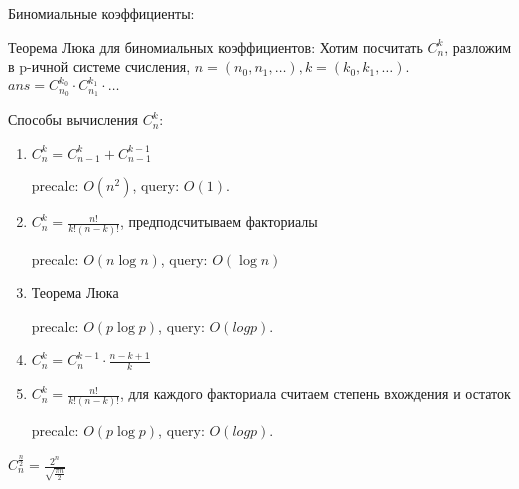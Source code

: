 Биномиальные коэффициенты:

Теорема Люка для биномиальных коэффициентов:
Хотим посчитать $C_n^k$, разложим в p-ичной системе счисления, 
$n = (n_0, n_1, \dots), k = (k_0, k_1, \dots)$.
$ans = C_{n_0} ^ {k_0} \cdot C_{n_1}^{k_1} \cdot \dots$

Способы вычисления $C_n^k$:
\begin{enumerate}
  \item
  $C_n^k = C_{n-1}^k + C_{n-1}^{k-1}$
  
  precalc: $O(n^2)$, query: $O(1)$.
  
  \item
  $C_n^k = \frac{n!}{k!(n - k)!}$, предподсчитываем факториалы
    
  precalc: $O(n \log n)$, query: $O(\log n)$
  
  \item
  Теорема Люка
    
  precalc: $O(p \log p)$, query: $O(log p)$.
  
  \item
  $C_n^k = C_n^{k-1} \cdot \frac{n - k + 1}{k}$

  \item
  $C_n^k = \frac{n!}{k!(n - k)!}$, для каждого факториала считаем степень вхождения и остаток
  
  precalc: $O(p \log p)$, query: $O(log p)$.

\end{enumerate}

$C_n^{\frac{n}{2}} = \frac{2^n}{\sqrt{\frac{\pi n}{2}}}$

